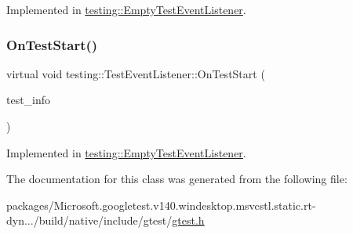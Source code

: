 Implemented in \mbox{\hyperlink{classtesting_1_1_empty_test_event_listener_aa3847c8a3c22d8d69a6006dfdd6589fc}{testing\+::\+Empty\+Test\+Event\+Listener}}.

\mbox{\label{classtesting_1_1_test_event_listener_ab4f6a0ca16ae75daf385b3b5914e1048}} 
\subsubsection{\texorpdfstring{OnTestStart()}{OnTestStart()}}
{\footnotesize\ttfamily virtual void testing\+::\+Test\+Event\+Listener\+::\+On\+Test\+Start (\begin{DoxyParamCaption}\item[{const \mbox{\hyperlink{classtesting_1_1_test_info}{Test\+Info}} \&}]{test\+\_\+info }\end{DoxyParamCaption})\hspace{0.3cm}{\ttfamily [pure virtual]}}



Implemented in \mbox{\hyperlink{classtesting_1_1_empty_test_event_listener_a84fa74cc9ba742f9f847ea405ca84e5e}{testing\+::\+Empty\+Test\+Event\+Listener}}.



The documentation for this class was generated from the following file\+:\begin{DoxyCompactItemize}
\item 
packages/\+Microsoft.\+googletest.\+v140.\+windesktop.\+msvcstl.\+static.\+rt-\/dyn.../build/native/include/gtest/\mbox{\hyperlink{gtest_8h}{gtest.\+h}}\end{DoxyCompactItemize}
